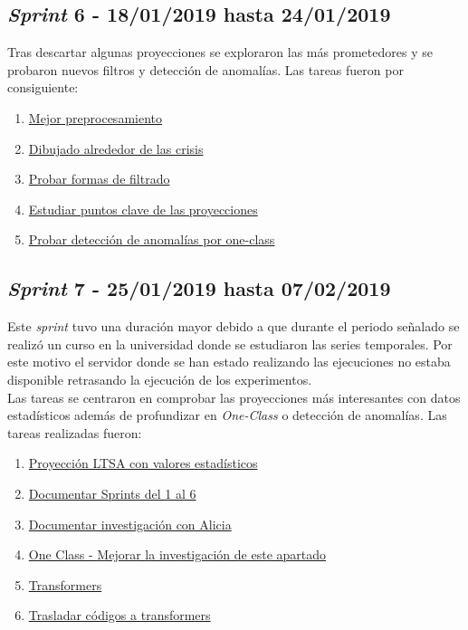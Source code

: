 \subsection{\textit{Sprint} 6 - 18/01/2019 hasta 24/01/2019}
Tras descartar algunas proyecciones se exploraron las más prometedores y se probaron nuevos filtros y detección de anomalías. Las tareas fueron por consiguiente:

\begin{enumerate}\addtocounter{enumi}{16}
	\item \href{https://github.com/joselucross/TFG-SmartBeds/issues/17}{ Mejor preprocesamiento}
	\item \href{https://github.com/joselucross/TFG-SmartBeds/issues/18}{ Dibujado alrededor de las crisis}
	\item \href{https://github.com/joselucross/TFG-SmartBeds/issues/19}{ Probar formas de filtrado}
	\item \href{https://github.com/joselucross/TFG-SmartBeds/issues/20}{ Estudiar puntos clave de las proyecciones}
	\item \href{https://github.com/joselucross/TFG-SmartBeds/issues/21}{ Probar detección de anomalías por one-class}
\end{enumerate}

\subsection{\textit{Sprint} 7 - 25/01/2019 hasta 07/02/2019}
Este \textit{sprint} tuvo una duración mayor debido a que durante el periodo señalado se realizó un curso en la universidad donde se estudiaron las series temporales. Por este motivo el servidor donde se han estado realizando las ejecuciones no estaba disponible retrasando la ejecución de los experimentos.\\

Las tareas se centraron en comprobar las proyecciones más interesantes con datos estadísticos además de profundizar en \textit{One-Class} o detección de anomalías. Las tareas realizadas fueron:
\begin{enumerate}\addtocounter{enumi}{21}
	\item \href{https://github.com/joselucross/TFG-SmartBeds/issues/22}{Proyección LTSA con valores estadísticos}
	\item 
	\href{https://github.com/joselucross/TFG-SmartBeds/issues/23}{Documentar Sprints del 1 al 6}
	\item
	\href{https://github.com/joselucross/TFG-SmartBeds/issues/24}{Documentar investigación con Alicia}
	\item
	\href{https://github.com/joselucross/TFG-SmartBeds/issues/25}{One Class - Mejorar la investigación de este apartado}
	\item
	\href{https://github.com/joselucross/TFG-SmartBeds/issues/26}{Transformers}
	\item
	\href{https://github.com/joselucross/TFG-SmartBeds/issues/27}{Trasladar códigos a transformers}
\end{enumerate}


